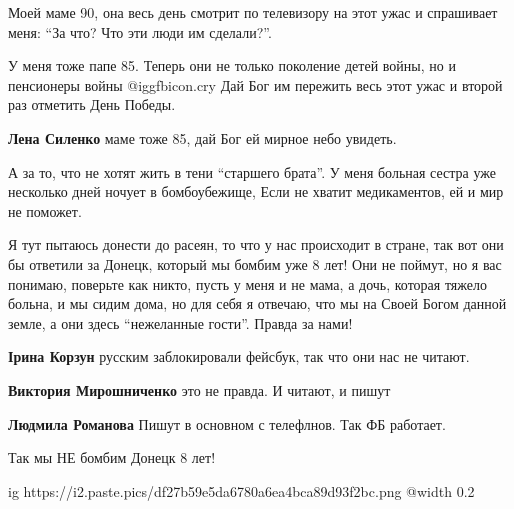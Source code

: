  
 
 
 
 
\zzSecCmt

\begin{itemize} %

Моей маме 90, она весь день смотрит по телевизору на этот ужас и спрашивает
меня: \enquote{За что? Что эти люди им сделали?}.


У меня тоже папе 85. Теперь они не только поколение детей войны, но и
пенсионеры войны  @igg{fbicon.cry}  Дай Бог им пережить весь этот ужас и второй раз отметить
День Победы.


\textbf{Лена Силенко} маме тоже 85, дай Бог ей мирное небо увидеть.


А за то, что не хотят жить в тени \enquote{старшего брата}. У меня больная сестра уже
несколько дней ночует в бомбоубежище, Если не хватит медикаментов, ей и мир не
поможет.


Я тут пытаюсь донести до расеян, то что у нас происходит в стране, так вот они
бы ответили за Донецк, который мы бомбим уже 8 лет!  Они не поймут, но я вас
понимаю, поверьте как никто, пусть у меня и не мама, а дочь, которая тяжело
больна, и мы сидим дома, но для себя я отвечаю, что мы на Своей Богом данной
земле, а они здесь \enquote{нежеланные гости}. Правда за нами!

\begin{itemize} %
\textbf{Ірина Корзун} русским заблокировали фейсбук, так что они нас не читают.

\textbf{Виктория Мирошниченко} это не правда. И читают, и пишут

\textbf{Людмила Романова} Пишут в основном с телефлнов. Так ФБ работает.

Так мы НЕ бомбим Донецк 8 лет!

\ifcmt
  ig https://i2.paste.pics/df27b59e5da6780a6ea4bca89d93f2bc.png
  @width 0.2
\fi


\end{itemize}
\end{itemize}
